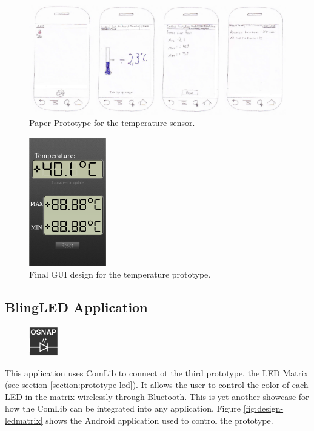 \begin{figure}[H]
\centering 
\includegraphics[width=1.0\textwidth]{img/prototype2-paper.png}
\caption{Paper Prototype for the temperature sensor.}
\label{fig:prototype2-paper}
\end{figure}

\begin{figure}[H]
\centering 
\includegraphics[width=0.3\textwidth]{img/prototype2-gui.png}
\caption{Final GUI design for the temperature prototype.}
\label{fig:prototype2-gui}
\end{figure}

\subsection{BlingLED Application}
\begin{figure}
	\centering \includegraphics[scale=1]{img/app-led}
\end{figure}
This application uses ComLib to connect ot the third prototype, the LED Matrix (see section \ref{section:prototype-led}). It allows the user to control the color of each LED in the matrix wirelessly through Bluetooth. This is yet another showcase for how the ComLib can be integrated into any application. Figure \ref{fig:design-ledmatrix} shows the Android application used to control the prototype.

